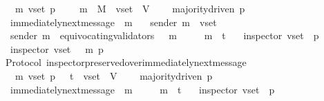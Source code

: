 \begin{isabellebody}
\ \ {\isachardoublequoteopen}{\isasymforall}\ {\isasymsigma}\ m\ v{\isacharunderscore}set\ p{\isachardot}\ {\isasymsigma}\ {\isasymin}\ {\isasymSigma}\ {\isasymand}\ m\ {\isasymin}\ M\ {\isasymand}\ v{\isacharunderscore}set\ {\isasymsubseteq}\ V\ \isanewline
\ \ {\isasymlongrightarrow}\ majority{\isacharunderscore}driven\ p\isanewline
\ \ {\isasymlongrightarrow}\ immediately{\isacharunderscore}next{\isacharunderscore}message\ {\isacharparenleft}{\isasymsigma}{\isacharcomma}\ m{\isacharparenright}\isanewline
\ \ {\isasymlongrightarrow}\ sender\ m\ {\isasymin}\ v{\isacharunderscore}set\isanewline
\ \ {\isasymlongrightarrow}\ sender\ m\ {\isasymin}\ equivocating{\isacharunderscore}validators\ {\isacharparenleft}{\isasymsigma}\ {\isasymunion}\ {\isacharbraceleft}m{\isacharbraceright}{\isacharparenright}\isanewline
\ \ {\isasymlongrightarrow}\ {\isasymsigma}\ {\isasymunion}\ {\isacharbraceleft}m{\isacharbraceright}\ {\isasymin}\ {\isasymSigma}t\isanewline
\ \ {\isasymlongrightarrow}\ inspector\ {\isacharparenleft}v{\isacharunderscore}set{\isacharcomma}\ {\isasymsigma}{\isacharcomma}\ p{\isacharparenright}\ \isanewline
\ \ {\isasymlongrightarrow}\ inspector\ {\isacharparenleft}v{\isacharunderscore}set{\isacharcomma}\ {\isasymsigma}\ {\isasymunion}\ {\isacharbraceleft}m{\isacharbraceright}{\isacharcomma}\ p{\isacharparenright}{\isachardoublequoteclose}\isanewline
\ \ \isanewline
%
\isadelimproof
\ \ %
\endisadelimproof
%
\isatagproof
{}\isamarkupfalse%
%
\endisatagproof
{\isafoldproof}%
%
\isadelimproof
\isanewline
%
\endisadelimproof
\isanewline
\isanewline
\isanewline
{}\isamarkupfalse%
\ {\isacharparenleft}\ Protocol{\isacharparenright}\ inspector{\isacharunderscore}preserved{\isacharunderscore}over{\isacharunderscore}immediately{\isacharunderscore}next{\isacharunderscore}message\ {\isacharcolon}\isanewline
\ \ {\isachardoublequoteopen}{\isasymforall}\ {\isasymsigma}\ m\ v{\isacharunderscore}set\ p{\isachardot}\ {\isasymsigma}\ {\isasymin}\ {\isasymSigma}t\ {\isasymand}\ v{\isacharunderscore}set\ {\isasymsubseteq}\ V\ \isanewline
\ \ {\isasymlongrightarrow}\ majority{\isacharunderscore}driven\ p\isanewline
\ \ {\isasymlongrightarrow}\ immediately{\isacharunderscore}next{\isacharunderscore}message\ {\isacharparenleft}{\isasymsigma}{\isacharcomma}\ m{\isacharparenright}\isanewline
\ \ {\isasymlongrightarrow}\ {\isasymsigma}\ {\isasymunion}\ {\isacharbraceleft}m{\isacharbraceright}\ {\isasymin}\ {\isasymSigma}t\isanewline
\ \ {\isasymlongrightarrow}\ inspector\ {\isacharparenleft}v{\isacharunderscore}set{\isacharcomma}\ {\isasymsigma}{\isacharcomma}\ p{\isacharparenright}\ \isanewline

\end{isabellebody}
